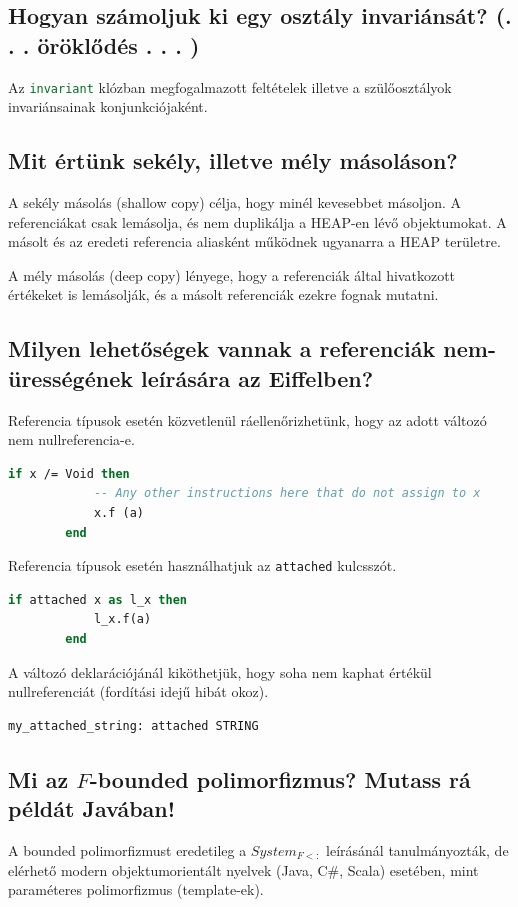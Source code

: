 \subsection{ Hogyan számoljuk ki egy osztály invariánsát? (. . . öröklődés . . . ) }
	Az \lstinline[language=Eiffel]|invariant| klózban megfogalmazott feltételek illetve a szülőosztályok invariánsainak konjunkciójaként.

\subsection{ Mit értünk sekély, illetve mély másoláson? }
	A sekély másolás (shallow copy) célja, hogy minél kevesebbet másoljon. A referenciákat csak lemásolja, és nem duplikálja a HEAP-en lévő objektumokat.
	A másolt és az eredeti referencia aliasként működnek ugyanarra a HEAP területre.
	
	A mély másolás (deep copy) lényege, hogy a referenciák által hivatkozott értékeket is lemásolják, és a másolt referenciák ezekre fognak mutatni.

\subsection{ Milyen lehetőségek vannak a referenciák nem-ürességének leírására az Eiffelben? }
	Referencia típusok esetén közvetlenül ráellenőrizhetünk, hogy az adott változó nem nullreferencia-e.
	\begin{lstlisting}[language=Eiffel]
		if x /= Void then
			-- Any other instructions here that do not assign to x
			x.f (a)
		end
	\end{lstlisting} 
	
	Referencia típusok esetén használhatjuk az \lstinline[language=Eiffel]|attached| kulcsszót.
	\begin{lstlisting}[language=Eiffel]
		if attached x as l_x then
			l_x.f(a)
		end
	\end{lstlisting}
	
	 A változó deklarációjánál kiköthetjük, hogy soha nem kaphat értékül nullreferenciát (fordítási idejű hibát okoz).
	\begin{lstlisting}[language=Eiffel]
		my_attached_string: attached STRING
	\end{lstlisting}
	
\subsection{ Mi az $F$-bounded polimorfizmus? Mutass rá példát Javában! }
	A bounded polimorfizmust eredetileg a $System_{F<:}$ leírásánál tanulmányozták, de elérhető modern objektumorientált nyelvek (Java, C\#, Scala) esetében, mint paraméteres polimorfizmus (template-ek). 
	
